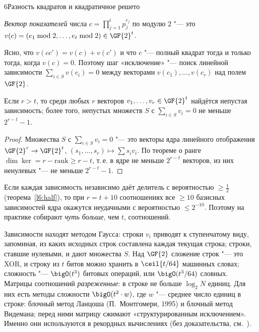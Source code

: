 \begin{lecture}{6}{Разность квадратов и квадратичное решето}
\begin{definition}
\emph{Вектор показателей} числа $c = \prod_{j=1}^{t} p_j^{e_j}$ по модулю $2$ "--- это
$v(c) = (e_1 \bmod 2, \dots, e_t \bmod 2) \in \GF{2}^{t}$.
\end{definition}

Ясно, что $v(c c') = v(c) + v(c')$ и что $c$ "--- полный квадрат тогда и только тогда, когда
$v(c) = 0$. Поэтому шаг «исключение» "--- поиск линейной зависимости
$\sum_{i \in S} v(c_i) = 0$ между векторами $v(c_1), \dots, v(c_r)$ над полем $\GF{2}$.

\begin{proposition}\label{l6:deps}
Если $r > t$, то среди любых $r$ векторов $v_1, \dots, v_r \in \GF{2}^t$ найдётся непустая
зависимость; более того, непустых множеств $S$ с $\sum_{i \in S} v_i = 0$ не меньше
$2^{r - t} - 1$.
\end{proposition}

\begin{proof}
Множества $S$ с $\sum_{i \in S} v_i = 0$ "--- это векторы ядра линейного отображения
$\GF{2}^r \to \GF{2}^t$, $(s_1, \dots, s_r) \mapsto \sum s_i v_i$. По теореме о ранге
$\dim \ker = r - \mathrm{rank} \ge r - t$, т.\,е. в ядре не меньше $2^{r-t}$ векторов, из них
ненулевых "--- не меньше $2^{r-t} - 1$.
\end{proof}

Если каждая зависимость независимо даёт делитель с вероятностью $\ge \frac12$
(теорема~\ref{l6:half}), то при $r = t + 10$ соотношениях все $\ge 10$ базисных зависимостей
ядра окажутся неудачными с вероятностью $\le 2^{-10}$. Поэтому на практике собирают
\emph{чуть больше}, чем $t$, соотношений.

Зависимости находят методом Гаусса: строки $v_i$ приводят к ступенчатому виду, запоминая, из
каких исходных строк составлена каждая текущая строка; строки, ставшие нулевыми, и дают
множества $S$. Над $\GF{2}$ сложение строк "--- это XOR, и строку из $t$ битов можно хранить в
$\ceil{t/64}$ машинных словах; сложность "--- $\bigO(t^3)$ битовых операций, или $\bigO(t^3/64)$
словных. Матрицы соотношений \emph{разреженные}: в строке не больше $\log_2 N$ единиц. Для них
есть методы сложности $\bigO(t^2 \cdot w)$, где $w$ "--- среднее число единиц в строке:
блочный метод Ланцоша (П.~Монтгомери, 1995) и блочный метод Видемана; перед ними матрицу
сжимают «структурированным исключением». Именно они используются в рекордных вычислениях
(без доказательства, см.~\cite[разд.~6.1.3]{crandall-pomerance}).



\end{lecture}
